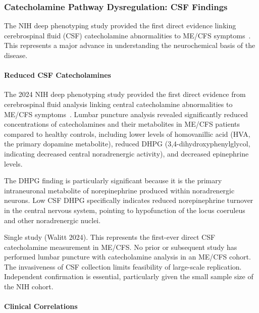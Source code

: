 \subsubsection{Catecholamine Pathway Dysregulation: CSF Findings}

The NIH deep phenotyping study provided the first direct evidence linking cerebrospinal fluid (CSF) catecholamine abnormalities to ME/CFS symptoms~\cite{walitt2024deep}. This represents a major advance in understanding the neurochemical basis of the disease.

\paragraph{Reduced CSF Catecholamines}

\begin{achievement}
\label{ach:catecholamine-deficit}
The 2024 NIH deep phenotyping study provided the first direct evidence from cerebrospinal fluid analysis linking central catecholamine abnormalities to ME/CFS symptoms~\cite{walitt2024deep}. Lumbar puncture analysis revealed significantly reduced concentrations of catecholamines and their metabolites in ME/CFS patients compared to healthy controls, including lower levels of homovanillic acid (HVA, the primary dopamine metabolite), reduced DHPG (3,4-dihydroxyphenylglycol, indicating decreased central noradrenergic activity), and decreased epinephrine levels.

The DHPG finding is particularly significant because it is the primary intraneuronal metabolite of norepinephrine produced within noradrenergic neurons. Low CSF DHPG specifically indicates reduced norepinephrine turnover in the central nervous system, pointing to hypofunction of the locus coeruleus and other noradrenergic nuclei.
\end{achievement}

\begin{warning}
Single study (Walitt 2024). This represents the first-ever direct CSF catecholamine measurement in ME/CFS. No prior or subsequent study has performed lumbar puncture with catecholamine analysis in an ME/CFS cohort. The invasiveness of CSF collection limits feasibility of large-scale replication. Independent confirmation is essential, particularly given the small sample size of the NIH cohort.
\end{warning}

\paragraph{Clinical Correlations}

